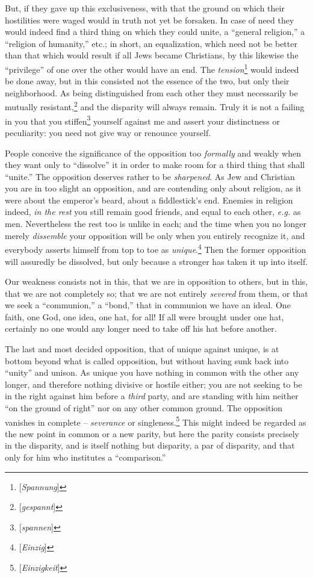 But, if they gave up this exclusiveness, with that the ground on which their 
hostilities were waged would in truth not yet be forsaken. In case of need 
they would indeed find a third thing on which they could unite, a ``general 
religion,'' a ``religion of humanity,'' etc.; in short, an equalization, 
which need not be better than that which would result if all Jews became 
Christians, by this likewise the ``privilege'' of one over the other would 
have an end. The \textit{tension}\footnote{[\textit{Spannung}]} would indeed 
be done away, but in this consisted not the essence of the two, but only their 
neighborhood. As being distinguished from each other they must necessarily be 
mutually resistant,\footnote{[\textit{gespannt}]} and the disparity will 
always remain. Truly it is not a failing in you that you 
stiffen\footnote{[\textit{spannen}]} yourself against me and assert your 
distinctness or peculiarity: you need not give way or renounce yourself.

People conceive the significance of the opposition too \textit{formally} and 
weakly when they want only to ``dissolve'' it in order to make room for a 
third thing that shall ``unite.'' The opposition deserves rather to be 
\textit{sharpened}. As Jew and Christian you are in too slight an opposition, 
and are contending only about religion, as it were about the emperor's beard, 
about a fiddlestick's end. Enemies in religion indeed, \textit{in the rest} 
you still remain good friends, and equal to each other, \textit{e.g.} as men. 
Nevertheless the rest too is unlike in each; and the time when you no longer 
merely \textit{dissemble} your opposition will be only when you entirely 
recognize it, and everybody asserts himself from top to toe as 
\textit{unique}.\footnote{[\textit{Einzig}]} Then the former opposition will 
assuredly be dissolved, but only because a stronger has taken it up into 
itself.

Our weakness consists not in this, that we are in opposition to others, but in 
this, that we are not completely so; that we are not entirely \textit{severed} 
from them, or that we seek a ``communion,'' a ``bond,'' that in communion 
we have an ideal. One faith, one God, one idea, one hat, for all! If all were 
brought under one hat, certainly no one would any longer need to take off his 
hat before another.

The last and most decided opposition, that of unique against unique, is at 
bottom beyond what is called opposition, but without having sunk back into 
``unity'' and unison. As unique you have nothing in common with the other 
any longer, and therefore nothing divisive or hostile either; you are not 
seeking to be in the right against him before a \textit{third} party, and are 
standing with him neither ``on the ground of right'' nor on any other common 
ground. The opposition vanishes in complete -- \textit{severance} or 
singleness.\footnote{[\textit{Einzigkeit}]} This might indeed be regarded as 
the new point in common or a new parity, but here the parity consists 
precisely in the disparity, and is itself nothing but disparity, a par of 
disparity, and that only for him who institutes a ``comparison.''

